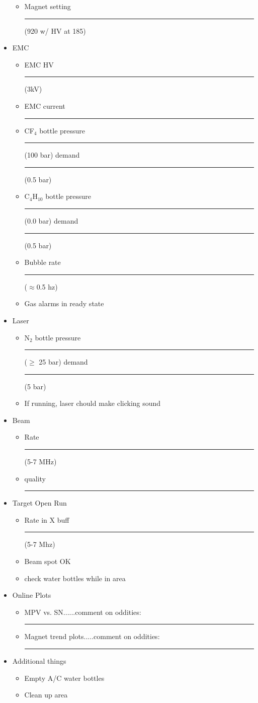 \documentclass[10pt]{article}
\begin{document}
\begin{itemize}
\begin{itemize}
      \item Magnet setting \rule[-1pt]{40pt}{1pt} (920 w/ HV at 185)
    \end{itemize}
  \item EMC
    \begin{itemize}
    \item EMC HV \rule[-1pt]{40pt}{1pt} (3kV)
    \item EMC current \rule[-1pt]{40pt}{1pt}
    \item CF$_{4}$ bottle pressure \rule[-1pt]{40pt}{1pt}(100 bar) demand \rule[-1pt]{40pt}{1pt}(0.5 bar)
    \item C$_{4}$H$_{10}$ bottle pressure \rule[-1pt]{40pt}{1pt}(0.0 bar) demand \rule[-1pt]{40pt}{1pt} (0.5 bar)
    \item Bubble rate \rule[-1pt]{40pt}{1pt} ($\approx$0.5 hz)
    \item Gas alarms in ready state
    \end{itemize}
  \item Laser 
    \begin{itemize} 
    \item N$_{2}$ bottle pressure \rule[-1pt]{40pt}{1pt} ($\ge$ 25 bar) demand \rule[-1pt]{40pt}{1pt} (5 bar)
    \item If running, laser chould make clicking sound
    \end{itemize}
  \item Beam
    \begin{itemize}
    \item Rate \rule[-1pt]{40pt}{1pt} (5-7 MHz)  
\item quality \rule[-1pt]{40pt}{1pt}
  \end{itemize}

    \item Target Open Run
      \begin{itemize}
      \item Rate in X buff \rule[-1pt]{40pt}{1pt} (5-7 Mhz)
      \item Beam spot OK
      \item check water bottles while in area
      \end{itemize}
   
  \item Online Plots
    \begin{itemize}
    \item MPV vs. SN......comment on oddities:\rule[-1pt]{40pt}{1pt}
    \item Magnet trend plots.....comment on oddities: \rule[-1pt]{40pt}{1pt}
    \end{itemize}
  \item Additional things
    \begin{itemize}
    \item Empty A/C water bottles
    \item Clean up area
    \end{itemize}
  \end{itemize}
  
  
\end{document}
